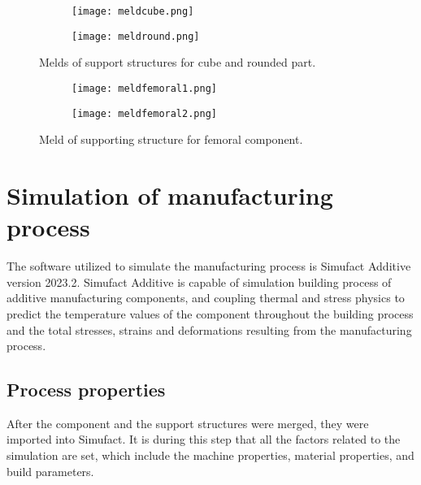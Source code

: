 \documentclass[../main.tex]{subfiles}
\begin{document}
\begin{figure}
  \begin{subfigure}{0.45\textwidth}
    \texttt{[image: meldcube.png]}
  \end{subfigure}
  \begin{subfigure}{0.45\textwidth}
      \texttt{[image: meldround.png]}
    \end{subfigure}
    \caption{Melds of support structures for cube and rounded part.}
  \end{figure}

\begin{figure}
  \begin{subfigure}{0.45\textwidth}
    \texttt{[image: meldfemoral1.png]}
  \end{subfigure}
  \begin{subfigure}{0.45\textwidth}
      \texttt{[image: meldfemoral2.png]}
    \end{subfigure}
  \caption{Meld of supporting structure for femoral component.}
\end{figure}

\section{Simulation of manufacturing process}

The software utilized to simulate the manufacturing process is Simufact Additive version 2023.2. Simufact Additive is capable of simulation building process of additive manufacturing components, and coupling thermal and stress physics to predict the temperature values of the component throughout the building process and the total stresses, strains and deformations resulting from the manufacturing process. 

\subsection{Process properties}

After the component and the support structures were merged, they were imported into Simufact. It is during this step that all the factors related to the simulation are set, which include the machine properties, material properties, and build parameters. 
\end{document}
